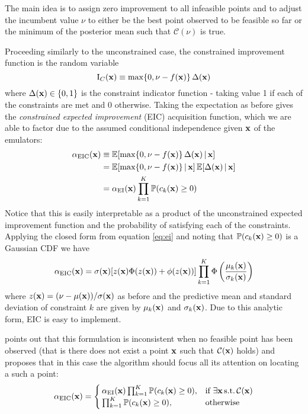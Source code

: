 The main idea is to assign zero improvement to all infeasible points and to adjust the incumbent value $\nu$ to either be the best point observed to be feasible so far or the minimum of the posterior mean such that $\mathcal{C}(\nu)$ is true. 

Proceeding similarly to the unconstrained case, the constrained improvement function is the random variable
\begin{equation}
\mathrm{I}_C(\mathbf{x}) \equiv \mathrm{max}\{0, \nu - f(\mathbf{x})\} \, \Delta(\mathbf{x})
\end{equation}
%
where $\Delta(\mathbf{x}) \in \{0, 1\}$ is the constraint indicator function - taking value 1 if each of the constraints are met and 0 otherwise. Taking the expectation as before gives the \textit{constrained expected improvement} (EIC) acquisition function, which we are able to factor due to the assumed conditional independence given $\mathbf{x}$ of the emulators:
%
\begin{align}
\nonumber \alpha_{\mathrm{EIC}}(\mathbf{x}) &\equiv \mathbb{E}[ \mathrm{max}\{0, \nu - f(\mathbf{x})\} \, \Delta(\mathbf{x}) \, \vert \, \mathbf{x} ] \\
\nonumber                 &= \mathbb{E}[\mathrm{max}\{0, \nu - f(\mathbf{x})\} \, \vert \, \mathbf{x}] \, \mathbb{E}[\Delta(\mathbf{x}) \, \vert \, \mathbf{x}] \\ 
                          &= \alpha_{\mathrm{EI}}(\mathbf{x})\prod_{k=1}^{K} \mathbb{P}(c_{k}(\mathbf{x}) \geq 0)
\end{align}
%
Notice that this is easily interpretable as a product of the unconstrained expected improvement function and the probability of satisfying each of the constraints. Applying the closed form from equation \ref{eq:ei} and noting that $\mathbb{P}(c_{k}(\mathbf{x}) \geq 0)$ is a Gaussian CDF we have
%
\begin{equation}
\alpha_{\mathrm{EIC}}(\mathbf{x}) = \sigma(\mathbf{x})[z(\mathbf{x})\Phi(z(\mathbf{x})) + \phi(z(\mathbf{x}))] \prod_{k=1}^{K} \Phi\left( \frac{\mu_k(\mathbf{x})}{\sigma_k(\mathbf{x})} \right)
\end{equation}
%
where $z(\mathbf{x}) = {(\nu - \mu(\mathbf{x}))}/{\sigma(\mathbf{x})}$ as before and the predictive mean and standard deviation of constraint $k$ are given by $\mu_k(\mathbf{x})$ and $\sigma_k(\mathbf{x})$. Due to this analytic form, EIC is easy to implement.

\citet{gelbart} points out that this formulation is inconsistent when no feasible point has been observed (that is there does not exist a point $\mathbf{x}$ such that $\mathcal{C}(\mathbf{x})$ holds) and proposes that in this case the algorithm should focus all its attention on locating a such a point:
\begin{equation}
\alpha_{\mathrm{EIC}}(\mathbf{x}) = 
\begin{cases} 
\, \alpha_{\mathrm{EI}}(\mathbf{x})\prod_{k=1}^{K} \mathbb{P}(c_{k}(\mathbf{x}) \geq 0), &\mbox{if } \exists \mathbf{x} \, \mathrm{s.t.} \, \mathcal{C}(\mathbf{x}) \\ 
\, \prod_{k=1}^{K} \mathbb{P}(c_{k}(\mathbf{x}) \geq 0), & \mbox{otherwise } 
\end{cases}
\end{equation}




